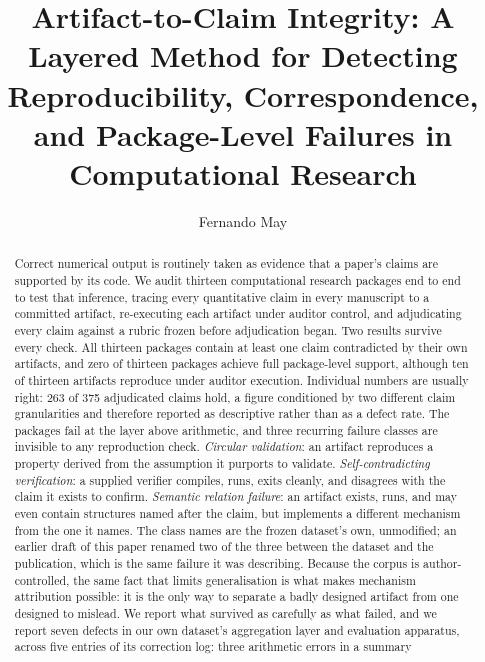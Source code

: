 \documentclass[sigconf,review]{acmart}
\begin{document}
\title{Artifact-to-Claim Integrity: A Layered Method for Detecting
Reproducibility, Correspondence, and Package-Level Failures in
Computational Research}

\author{Fernando May}

\begin{abstract}
Correct numerical output is routinely taken as evidence that a paper's claims
are supported by its code. We audit thirteen computational research packages
end to end to test that inference, tracing every quantitative claim in every
manuscript to a committed artifact, re-executing each artifact under auditor
control, and adjudicating every claim against a rubric frozen before
adjudication began. Two results survive every check. All thirteen packages
contain at least one claim contradicted by their own artifacts, and zero of
thirteen packages achieve full package-level support, although ten of thirteen
artifacts reproduce under auditor execution. Individual numbers are usually
right: 263 of 375 adjudicated claims hold, a figure conditioned by two
different claim granularities and therefore reported as descriptive rather
than as a defect rate. The packages fail at the layer above arithmetic, and
three recurring failure classes are invisible to any reproduction check.
\emph{Circular validation}: an artifact reproduces a property derived from the
assumption it purports to validate. \emph{Self-contradicting verification}: a
supplied verifier compiles, runs, exits cleanly, and disagrees with the claim
it exists to confirm. \emph{Semantic relation failure}: an artifact
exists, runs, and may even contain structures named after the claim, but
implements a different mechanism from the one it names. The class names are
the frozen dataset's own, unmodified; an earlier draft of this paper renamed
two of the three between the dataset and the publication, which is the same
failure it was describing. Because the corpus is author-controlled, the same
fact that limits generalisation is what makes mechanism attribution possible:
it is the only way to separate a badly designed artifact from one designed to
mislead. We report what survived as carefully as what failed, and we report
seven defects in our own dataset's aggregation layer and evaluation apparatus,
across five entries of its correction log: three arithmetic errors in a summary

\end{abstract}
\end{document}
